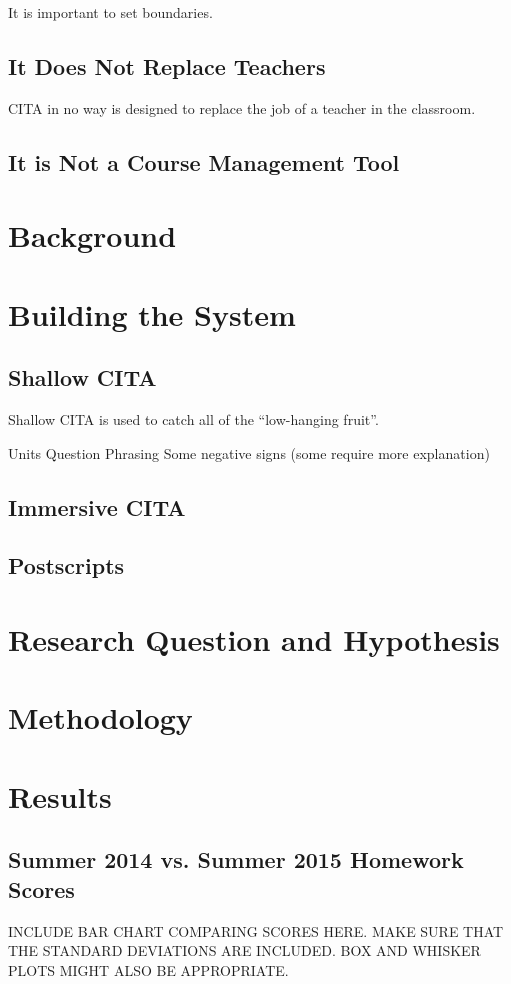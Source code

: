 It is important to set boundaries.

\subsection{It Does Not Replace Teachers}

CITA in no way is designed to replace the job of a teacher in the classroom.

\subsection{It is Not a Course Management Tool}



\section{Background}

\section{Building the System}

\subsection{Shallow CITA}

Shallow CITA is used to catch all of the ``low-hanging fruit''.

Units
Question Phrasing
Some negative signs (some require more explanation)

\subsection{Immersive CITA}

\subsection{Postscripts}

\section{Research Question and Hypothesis}

\section{Methodology}

\section{Results}

\subsection{Summer 2014 vs. Summer 2015 Homework Scores}

INCLUDE BAR CHART COMPARING SCORES HERE. MAKE SURE THAT THE STANDARD DEVIATIONS ARE INCLUDED. BOX AND WHISKER PLOTS MIGHT ALSO BE APPROPRIATE.